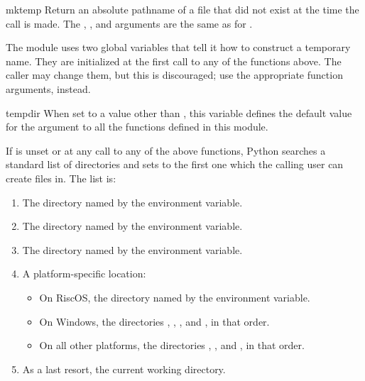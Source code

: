 \begin{funcdesc}{mktemp}{}
Return an absolute pathname of a file that did not exist at the time
the call is made.  The , , and 
arguments are the same as for .

\end{funcdesc}

The module uses two global variables that tell it how to construct a
temporary name.  They are initialized at the first call to any of the
functions above.  The caller may change them, but this is discouraged;
use the appropriate function arguments, instead.

\begin{datadesc}{tempdir}
When set to a value other than , this variable defines the
default value for the  argument to all the functions defined
in this module.

If  is unset or  at any call to any of the
above functions, Python searches a standard list of directories and
sets  to the first one which the calling user can create
files in.  The list is:

\begin{enumerate}
\item The directory named by the  environment variable.
\item The directory named by the  environment variable.
\item The directory named by the  environment variable.
\item A platform-specific location:
    \begin{itemize}
    \item On RiscOS, the directory named by the
           environment variable.
    \item On Windows, the directories
          ,
          ,
          , and
          , in that order.
    \item On all other platforms, the directories
          , , and , in that order.
    \end{itemize}
\item As a last resort, the current working directory.
\end{enumerate}
\end{datadesc}

